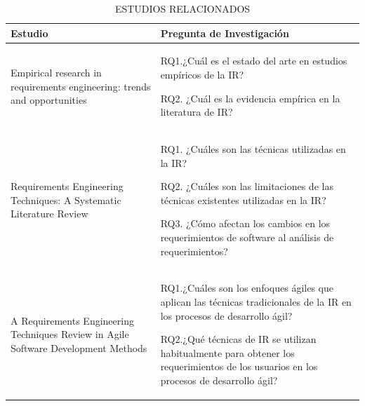 \documentclass[journal]{IEEEtran}
\begin{document}
\begin{table}[!t]
\renewcommand{\arraystretch}{1.3}
\caption{ESTUDIOS RELACIONADOS}
\label{tabla1}
\centering
\begin{tabular}{p{3cm}p{4.5cm}}
\hline
\hline Estudio & Pregunta de Investigación \\
\hline
Empirical research in requirements engineering: trends and opportunities  & RQ1.¿Cuál es el estado del arte en estudios empíricos de la IR? 

RQ2. ¿Cuál es la evidencia empírica en la literatura de IR?
\\ \cline{1-2}
Requirements Engineering Techniques: A Systematic Literature Review  & RQ1. ¿Cuáles son las técnicas utilizadas en la IR?

RQ2. ¿Cuáles son las limitaciones de las técnicas existentes utilizadas en la IR?

RQ3. ¿Cómo afectan los cambios en los requerimientos de software al análisis de requerimientos?
 \\ \cline{1-2}
A Requirements Engineering Techniques Review in Agile Software Development Methods & RQ1.¿Cuáles son los enfoques ágiles que aplican las técnicas tradicionales de la IR en los procesos de desarrollo ágil?

RQ2.¿Qué técnicas de IR se utilizan habitualmente para obtener los requerimientos de los usuarios en los procesos de desarrollo ágil?
 \\
\hline \hline                                                                                                    
\end{tabular}
\end{table}
\end{document}
